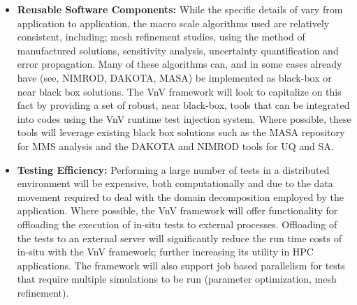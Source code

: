 \begin{itemize}
 
 \item {\bf Reusable Software Components:} While the specific details of \VV vary from application to application, the macro scale algorithms used are relatively consistent, including; mesh refinement studies, using the method of manufactured solutions, sensitivity analysis, uncertainty quantification and error propagation. Many of these algorithms can, and in some cases already have (see, NIMROD, DAKOTA, MASA) be implemented as black-box or near black box solutions. The VnV framework will look to capitalize on this fact by providing a set of robust, near black-box, \VV tools that can be integrated into codes using the VnV runtime test injection system. Where possible, these tools will leverage existing black box solutions such as the MASA repository for MMS analysis and the DAKOTA and NIMROD tools for UQ and SA.  
  
 \item{\bf \VV Testing Efficiency:}  Performing a large number of \VV tests in a distributed environment will be expensive, both computationally and due to the data movement required to deal with the domain decomposition employed by the application. Where possible, the VnV framework will offer functionality for offloading the execution of in-situ tests to external processes. Offloading of the tests to an external server will significantly reduce the run time costs of in-situ \VV with the VnV framework; further increasing its utility in HPC applications. The framework will also support job based parallelism for tests that require multiple simulations to be run (parameter optimization, mesh refinement). 
 

\end{itemize}
